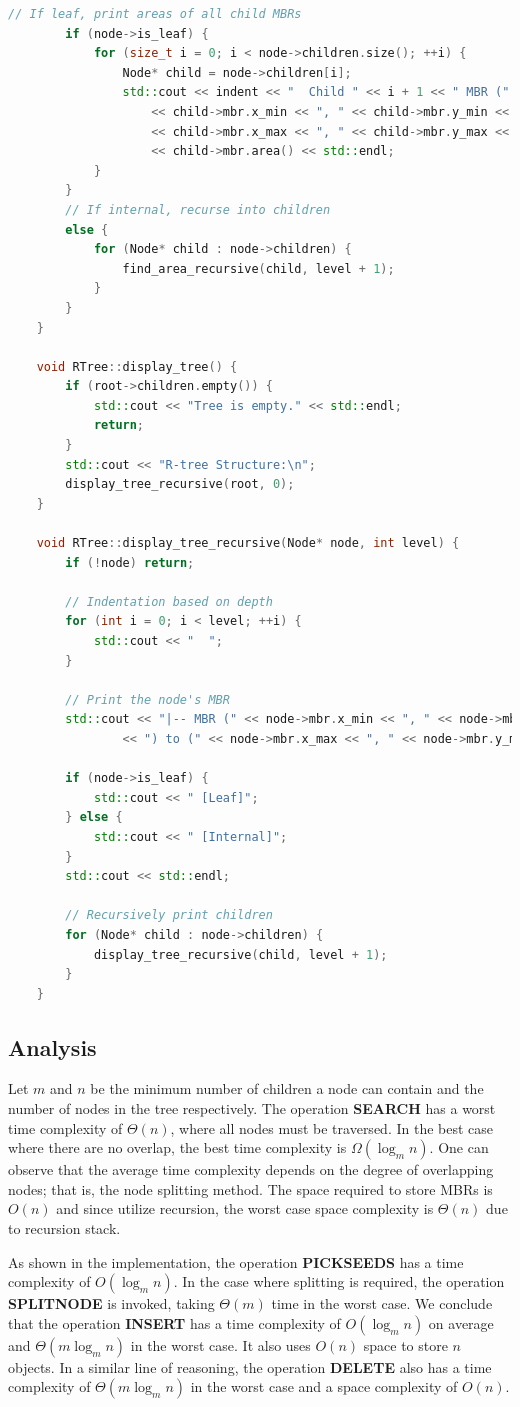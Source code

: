 \documentclass{article}
\begin{document}
\begin{lstlisting}[language=c++]
		// If leaf, print areas of all child MBRs
		if (node->is_leaf) {
			for (size_t i = 0; i < node->children.size(); ++i) {
				Node* child = node->children[i];
				std::cout << indent << "  Child " << i + 1 << " MBR ("
					<< child->mbr.x_min << ", " << child->mbr.y_min << ", "
					<< child->mbr.x_max << ", " << child->mbr.y_max << "): "
					<< child->mbr.area() << std::endl;
			}
		}
		// If internal, recurse into children
		else {
			for (Node* child : node->children) {
				find_area_recursive(child, level + 1);
			}
		}
	}

	void RTree::display_tree() {
		if (root->children.empty()) {
			std::cout << "Tree is empty." << std::endl;
			return;
		}
		std::cout << "R-tree Structure:\n";
		display_tree_recursive(root, 0);
	}

	void RTree::display_tree_recursive(Node* node, int level) {
		if (!node) return;

		// Indentation based on depth
		for (int i = 0; i < level; ++i) {
			std::cout << "  ";
		}

		// Print the node's MBR
		std::cout << "|-- MBR (" << node->mbr.x_min << ", " << node->mbr.y_min
				<< ") to (" << node->mbr.x_max << ", " << node->mbr.y_max << ")";

		if (node->is_leaf) {
			std::cout << " [Leaf]";
		} else {
			std::cout << " [Internal]";
		}
		std::cout << std::endl;

		// Recursively print children
		for (Node* child : node->children) {
			display_tree_recursive(child, level + 1);
		}
	}
\end{lstlisting}

\subsection{Analysis}
Let $m$ and $n$ be the minimum number of children a node can contain and the number of nodes in the tree respectively. The operation \textbf{SEARCH} has a worst time complexity of $\Theta(n)$, where all nodes must be traversed. In the best case where there are no overlap, the best time complexity is $\Omega(\log_m n)$. One can observe that the average time complexity depends on the degree of overlapping nodes; that is, the node splitting method. The space required to store MBRs is $O(n)$ and since utilize recursion, the worst case space complexity is $\Theta(n)$ due to recursion stack.

As shown in the implementation, the operation \textbf{PICKSEEDS} has a time complexity of $O(\log_m n)$. In the case where splitting is required, the operation \textbf{SPLITNODE} is invoked, taking $\Theta(m)$ time in the worst case. We conclude that the operation \textbf{INSERT} has a time complexity of $O(\log_m n)$ on average and $\Theta(m\log_m n)$ in the worst case. It also uses $O(n)$ space to store $n$ objects. In a similar line of reasoning, the operation \textbf{DELETE} also has a time complexity of $\Theta(m\log_m n)$ in the worst case and a space complexity of $O(n)$.
\end{document}
